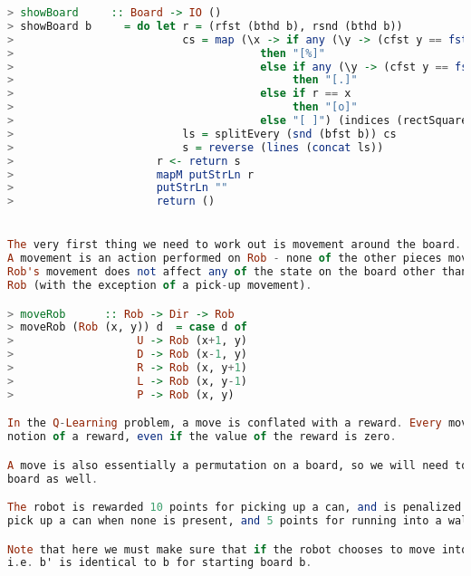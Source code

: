 \documentclass[12pt,a4paper]{article}
\begin{document}
\begin{lstlisting}[language=Haskell,numbers=none,basicstyle=\tiny]
> showBoard     :: Board -> IO ()
> showBoard b     = do let r = (rfst (bthd b), rsnd (bthd b))
>                          cs = map (\x -> if any (\y -> (cfst y == fst x) && (csnd y == snd x)) (bsnd b) && (r == x)
>                                      then "[%]"
>                                      else if any (\y -> (cfst y == fst x) && (csnd y == snd x)) (bsnd b) 
>                                           then "[.]"
>                                      else if r == x
>                                           then "[o]" 
>                                      else "[ ]") (indices (rectSquareGrid (fst (bfst b)) (snd (bfst b))))
>                          ls = splitEvery (snd (bfst b)) cs
>                          s = reverse (lines (concat ls))
>                      r <- return s
>                      mapM putStrLn r
>                      putStrLn ""
>                      return ()


The very first thing we need to work out is movement around the board.
A movement is an action performed on Rob - none of the other pieces move.
Rob's movement does not affect any of the state on the board other than 
Rob (with the exception of a pick-up movement).

> moveRob      :: Rob -> Dir -> Rob
> moveRob (Rob (x, y)) d  = case d of
>                   U -> Rob (x+1, y)
>                   D -> Rob (x-1, y)
>                   R -> Rob (x, y+1)
>                   L -> Rob (x, y-1)
>                   P -> Rob (x, y)

In the Q-Learning problem, a move is conflated with a reward. Every move returns some
notion of a reward, even if the value of the reward is zero. 

A move is also essentially a permutation on a board, so we will need to return the updated
board as well.

The robot is rewarded 10 points for picking up a can, and is penalized 1 point for attempting to
pick up a can when none is present, and 5 points for running into a wall. 

Note that here we must make sure that if the robot chooses to move into a wall, it "bounces back,"
i.e. b' is identical to b for starting board b.


\end{lstlisting}
\end{document}
